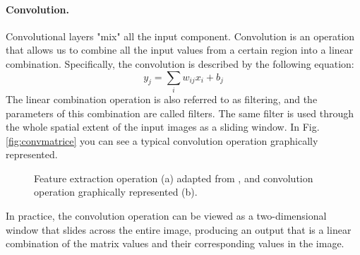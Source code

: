 \paragraph{Convolution.} Convolutional layers "mix" all the input component. Convolution is an operation that allows us to combine all the input values from a certain region into a linear combination. Specifically, the convolution is described by the following equation:
\begin{equation}
    \label{eq:convolution}
    y_j=\sum_iw_{ij}x_i+b_j
\end{equation}
The linear combination operation is also referred to as filtering, and the parameters of this combination are called filters. The same filter is used through the whole spatial extent of the input images as a sliding window. In Fig. \ref{fig:convmatrice} you can see a typical convolution operation graphically represented.
\begin{figure}
    \centering
    \qquad
    \caption[Convolution operation.]{Feature extraction operation (a) adapted from \cite{giacomo_boracchi_convolutional_2021}, and convolution operation graphically represented (b)\cite{giacomo_boracchi_convolutional_2021}.}
\end{figure}
In practice, the convolution operation can be viewed as a two-dimensional window that slides across the entire image, producing an output that is a linear combination of the matrix values and their corresponding values in the image.

